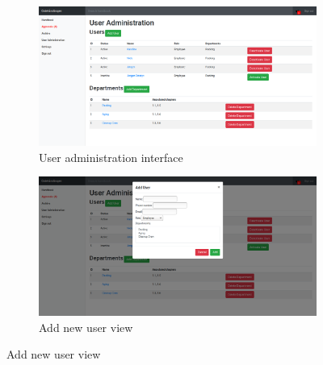 \begin{figure}[H]
	\centering
	\begin{subfigure}[b]{0.48\textwidth}
		\includegraphics[width=\textwidth]{billeder/iteration1Prototyper/UserAdministration.png}
		\caption{User administration interface}
		\label{fig:3-UserAdmin}
	\end{subfigure}
	\quad
	\begin{subfigure}[b]{0.48\textwidth}
		\includegraphics[width=\textwidth]{billeder/iteration1Prototyper/AddUser.png}
		\caption{Add new user view}
		\label{fig:3-addUser}
	\end{subfigure}
\end{figure}
